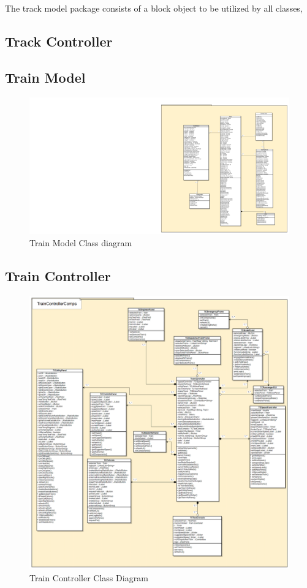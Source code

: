 \documentclass[]{article}
\begin{document}
The track model package consists of a block object to be utilized by all classes, 
\subsection{Track Controller}
\subsection{Train Model}
\begin{figure}[H]
	\centering
	\includegraphics[scale=.75]{trainmodelclassdiagram.png}
	\caption{Train Model Class diagram}
\end{figure}
\subsection{Train Controller}
\begin{figure}[H]
	\centering
	\includegraphics[scale=.5]{tc_classdiagram.png}
	\caption{Train Controller Class Diagram}
\end{figure}
\end{document}
